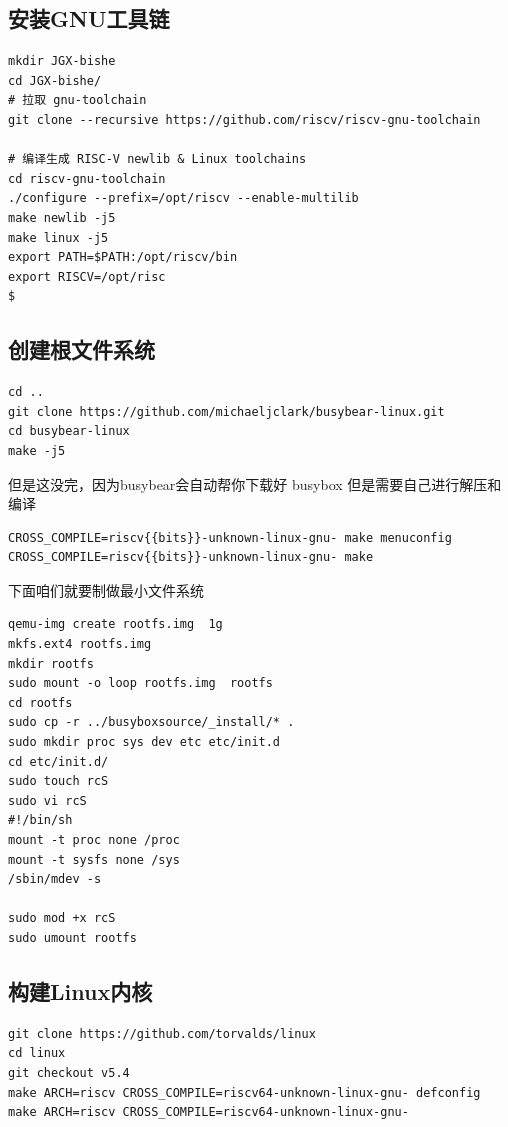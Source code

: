 \subsection{安装GNU工具链}

\begin{lstlisting}
mkdir JGX-bishe
cd JGX-bishe/
# 拉取 gnu-toolchain
git clone --recursive https://github.com/riscv/riscv-gnu-toolchain

# 编译生成 RISC-V newlib & Linux toolchains
cd riscv-gnu-toolchain
./configure --prefix=/opt/riscv --enable-multilib
make newlib -j5
make linux -j5
export PATH=$PATH:/opt/riscv/bin
export RISCV=/opt/risc
$
\end{lstlisting}

\subsection{创建根文件系统}
\begin{lstlisting}
cd ..
git clone https://github.com/michaeljclark/busybear-linux.git
cd busybear-linux
make -j5
\end{lstlisting}

但是这没完，因为busybear会自动帮你下载好 busybox 但是需要自己进行解压和编译

\begin{lstlisting}
CROSS_COMPILE=riscv{{bits}}-unknown-linux-gnu- make menuconfig
CROSS_COMPILE=riscv{{bits}}-unknown-linux-gnu- make
\end{lstlisting}

下面咱们就要制做最小文件系统
\begin{lstlisting}
qemu-img create rootfs.img  1g
mkfs.ext4 rootfs.img
mkdir rootfs
sudo mount -o loop rootfs.img  rootfs
cd rootfs
sudo cp -r ../busyboxsource/_install/* .
sudo mkdir proc sys dev etc etc/init.d
cd etc/init.d/
sudo touch rcS
sudo vi rcS
#!/bin/sh
mount -t proc none /proc
mount -t sysfs none /sys
/sbin/mdev -s

sudo mod +x rcS
sudo umount rootfs
\end{lstlisting}

\subsection{构建Linux内核}
\begin{lstlisting}
git clone https://github.com/torvalds/linux
cd linux
git checkout v5.4
make ARCH=riscv CROSS_COMPILE=riscv64-unknown-linux-gnu- defconfig
make ARCH=riscv CROSS_COMPILE=riscv64-unknown-linux-gnu-
\end{lstlisting}

